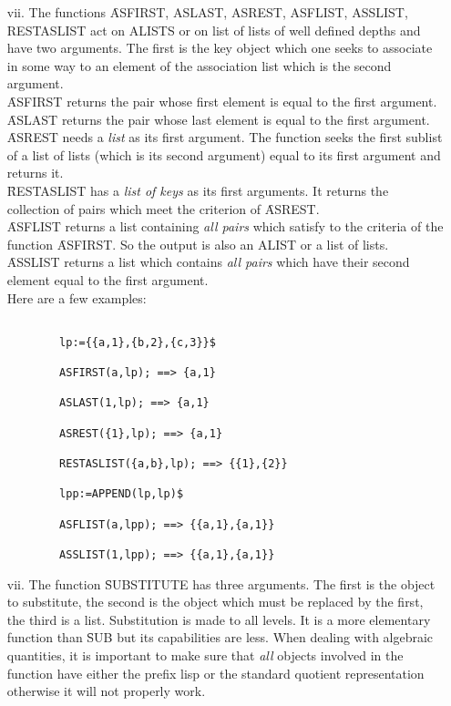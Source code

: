 \begin{itemize}
\begin{verbatim}
\end{verbatim}
\item[vii.]
The functions \f{ASFIRST, ASLAST, ASREST, ASFLIST, ASSLIST, \\RESTASLIST}
act on ALISTS or on list of lists of well defined depths
and have two arguments. The first is the key object
which one seeks to associate in some way to an element of the association
list which is the second argument.\\
\f{ASFIRST} returns the pair whose first element is equal to the
first argument.\\
\f{ASLAST} returns the pair whose last element is equal to the first
argument.\\
\f{ASREST} needs a {\em list} as its first argument. The function
seeks the first sublist of a list of lists (which is its second argument)
equal to its first argument and returns it.\\
\f{RESTASLIST} has a {\em list of keys} as its first arguments. It
returns the collection of pairs which meet the criterion of \f{ASREST}.\\
\f{ASFLIST} returns a list containing {\em all pairs} which
satisfy to the criteria of the function \f{ASFIRST}. So the output
is also an ALIST or a list of lists.\\
\f{ASSLIST} returns a list which contains {\em all pairs} which have
their second element equal to the first argument.\\
Here are a few examples:
\begin{verbatim}

        lp:={{a,1},{b,2},{c,3}}$

        ASFIRST(a,lp); ==> {a,1}

        ASLAST(1,lp); ==> {a,1}

        ASREST({1},lp); ==> {a,1}

        RESTASLIST({a,b},lp); ==> {{1},{2}}

        lpp:=APPEND(lp,lp)$

        ASFLIST(a,lpp); ==> {{a,1},{a,1}}

        ASSLIST(1,lpp); ==> {{a,1},{a,1}}

\end{verbatim}
\item[vii.] The function \f{SUBSTITUTE} has three arguments. The first
is the object to substitute, the second is the object which must be
replaced by the first, the third is a list. Substitution is made to
all levels. It is a more elementary function than \f{SUB} but its
capabilities are less. When dealing with algebraic quantities, it is
important to make sure that {\em all} objects involved in the function
have either the prefix lisp or the standard quotient representation
otherwise it will not properly work.
\end{itemize}
